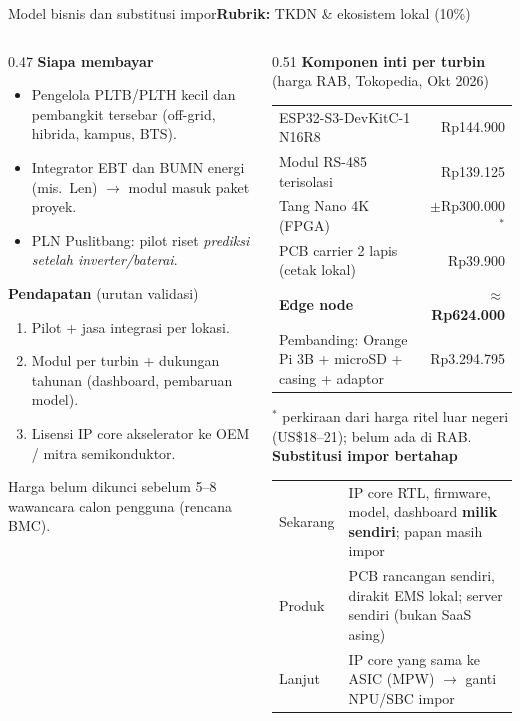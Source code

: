 \documentclass[aspectratio=169, 10pt]{beamer}
\newcommand{\kriteria}[1]{\hfill{\scriptsize\mdseries\color{krem!75}\textbf{Rubrik:} #1}}
\begin{document}
\begin{frame}[label=bisnis]{Model bisnis dan substitusi impor\kriteria{TKDN \& ekosistem lokal (10\%)}}
\begin{columns}[T]
\begin{column}{0.47\linewidth}
\small
\textbf{Siapa membayar}
\begin{itemize}\scriptsize
  \item Pengelola PLTB/PLTH kecil dan pembangkit tersebar (off-grid, hibrida, kampus, BTS).
  \item Integrator EBT dan BUMN energi (mis.\ Len) $\to$ modul masuk paket proyek.
  \item PLN Puslitbang: pilot riset \emph{prediksi setelah inverter/baterai}.
\end{itemize}
\textbf{Pendapatan} (urutan validasi)
\begin{enumerate}\scriptsize
  \item Pilot + jasa integrasi per lokasi.
  \item Modul per turbin + dukungan tahunan (dashboard, pembaruan model).
  \item Lisensi IP core akselerator ke OEM / mitra semikonduktor.
\end{enumerate}
{\scriptsize Harga belum dikunci sebelum 5--8 wawancara calon pengguna (rencana BMC).}
\end{column}
\begin{column}{0.51\linewidth}
\small\textbf{Komponen inti per turbin} {\scriptsize(harga RAB, Tokopedia, Okt 2026)}\\[2pt]
\scriptsize
\begin{tabularx}{\linewidth}{@{}X r@{}}
\toprule
ESP32-S3-DevKitC-1 N16R8 & Rp144.900 \\
Modul RS-485 terisolasi & Rp139.125 \\
Tang Nano 4K (FPGA) & $\pm$Rp300.000$^{*}$ \\
PCB carrier 2 lapis (cetak lokal) & Rp39.900 \\
\midrule
\textbf{Edge node} & \textbf{$\approx$Rp624.000} \\
Pembanding: Orange Pi 3B + microSD + casing + adaptor & Rp3.294.795 \\
\bottomrule
\end{tabularx}
{\tiny $^{*}$ perkiraan dari harga ritel luar negeri (US\$18--21); belum ada di RAB.}\\[4pt]
\textbf{Substitusi impor bertahap}
\begin{tabularx}{\linewidth}{@{}l X@{}}
Sekarang & IP core RTL, firmware, model, dashboard \textbf{milik sendiri}; papan masih impor \\
Produk & PCB rancangan sendiri, dirakit EMS lokal; server sendiri (bukan SaaS asing) \\
Lanjut & IP core yang sama ke ASIC (MPW) $\to$ ganti NPU/SBC impor \\
\end{tabularx}
\end{column}
\end{columns}
\end{frame}
\end{document}
